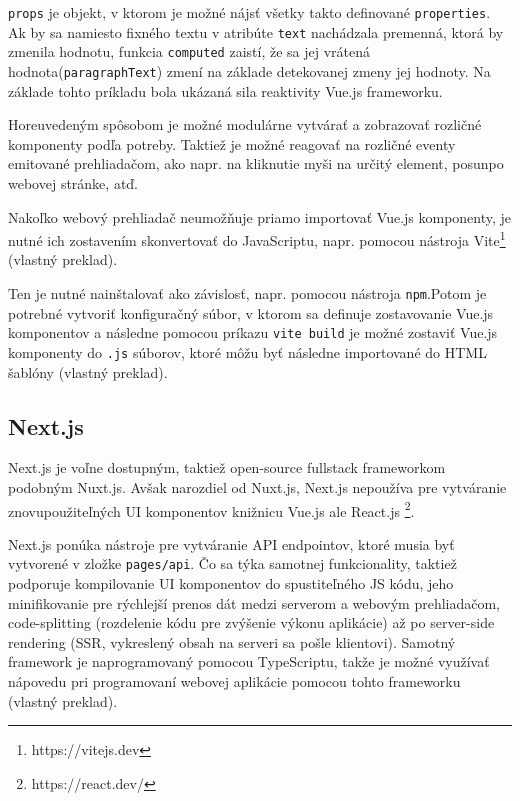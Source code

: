 \texttt{props} je objekt, v ktorom je možné nájsť všetky takto definované \texttt{properties}. Ak by sa namiesto fixného textu v atribúte \texttt{text} nachádzala premenná, ktorá by zmenila hodnotu, funkcia \texttt{computed} zaistí, že sa jej vrátená hodnota\newline (\texttt{paragraphText}) zmení na základe detekovanej zmeny jej hodnoty.
Na základe tohto príkladu bola ukázaná sila reaktivity Vue.js frameworku.

\clearpage

Horeuvedeným spôsobom je možné modulárne vytvárať a zobrazovať rozličné komponenty podľa potreby. Taktiež je možné reagovať na rozličné eventy emitované prehliadačom, ako napr. na kliknutie myši na určitý element, posun\newline po webovej stránke, atď.

Nakoľko webový prehliadač neumožňuje priamo importovať Vue.js komponenty, je nutné ich zostavením skonvertovať do JavaScriptu, napr. pomocou nástroja Vite\footnote{https://vitejs.dev} \cite{vuejs_introduction} (vlastný preklad).

Ten je nutné nainštalovať ako závislosť, napr. pomocou nástroja \texttt{npm}.\newline Potom je potrebné vytvoriť konfiguračný súbor, v ktorom sa definuje zostavovanie Vue.js komponentov a následne pomocou príkazu \texttt{vite build} je možné zostaviť Vue.js komponenty do \texttt{.js} súborov, ktoré môžu byť následne importované do HTML šablóny \cite{vuejs_introduction} (vlastný preklad).

\subsection {Next.js}
Next.js je voľne dostupným, taktiež open-source fullstack frameworkom podobným Nuxt.js. Avšak narozdiel od Nuxt.js, Next.js nepoužíva pre vytváranie znovupoužiteľných UI komponentov knižnicu Vue.js ale React.js \footnote{https://react.dev/}.

Next.js ponúka nástroje pre vytváranie API endpointov, ktoré musia byť vytvorené v zložke \texttt{pages/api}. Čo sa týka samotnej funkcionality, taktiež podporuje kompilovanie UI komponentov do spustiteľného JS kódu, jeho minifikovanie pre rýchlejší prenos dát medzi serverom a webovým prehliadačom, code-splitting (rozdelenie kódu pre zvýšenie výkonu aplikácie) až po server-side rendering (SSR, vykreslený obsah na serveri sa pošle klientovi). Samotný framework je naprogramovaný pomocou TypeScriptu, takže je možné využívať nápovedu pri programovaní webovej aplikácie pomocou tohto frameworku \cite{nextjs_introduction} (vlastný preklad).

